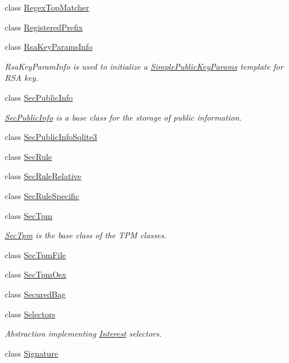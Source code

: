 \begin{DoxyCompactItemize}
class \hyperlink{classndn_1_1RegexTopMatcher}{Regex\+Top\+Matcher}
\item 
class \hyperlink{classndn_1_1RegisteredPrefix}{Registered\+Prefix}
\item 
class \hyperlink{classndn_1_1RsaKeyParamsInfo}{Rsa\+Key\+Params\+Info}
\begin{DoxyCompactList}\small\item\em Rsa\+Key\+Param\+Info is used to initialize a \hyperlink{classndn_1_1SimplePublicKeyParams}{Simple\+Public\+Key\+Params} template for R\+SA key. \end{DoxyCompactList}\item 
class \hyperlink{classndn_1_1SecPublicInfo}{Sec\+Public\+Info}
\begin{DoxyCompactList}\small\item\em \hyperlink{classndn_1_1SecPublicInfo}{Sec\+Public\+Info} is a base class for the storage of public information. \end{DoxyCompactList}\item 
class \hyperlink{classndn_1_1SecPublicInfoSqlite3}{Sec\+Public\+Info\+Sqlite3}
\item 
class \hyperlink{classndn_1_1SecRule}{Sec\+Rule}
\item 
class \hyperlink{classndn_1_1SecRuleRelative}{Sec\+Rule\+Relative}
\item 
class \hyperlink{classndn_1_1SecRuleSpecific}{Sec\+Rule\+Specific}
\item 
class \hyperlink{classndn_1_1SecTpm}{Sec\+Tpm}
\begin{DoxyCompactList}\small\item\em \hyperlink{classndn_1_1SecTpm}{Sec\+Tpm} is the base class of the T\+PM classes. \end{DoxyCompactList}\item 
class \hyperlink{classndn_1_1SecTpmFile}{Sec\+Tpm\+File}
\item 
class \hyperlink{classndn_1_1SecTpmOsx}{Sec\+Tpm\+Osx}
\item 
class \hyperlink{classndn_1_1SecuredBag}{Secured\+Bag}
\item 
class \hyperlink{classndn_1_1Selectors}{Selectors}
\begin{DoxyCompactList}\small\item\em Abstraction implementing \hyperlink{classndn_1_1Interest}{Interest} selectors. \end{DoxyCompactList}\item 
class \hyperlink{classndn_1_1Signature}{Signature}
\item 

\end{DoxyCompactItemize}
